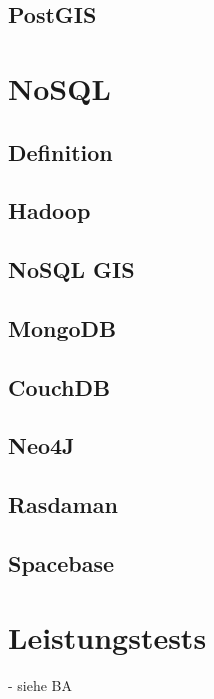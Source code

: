 \subsection{PostGIS}



\section{NoSQL}

\subsection{Definition}

\subsection{Hadoop}

\subsection{NoSQL GIS}

\subsection{MongoDB}

\subsection{CouchDB}

\subsection{Neo4J}

\subsection{Rasdaman}

\subsection{Spacebase}


\section{Leistungstests}

- siehe BA